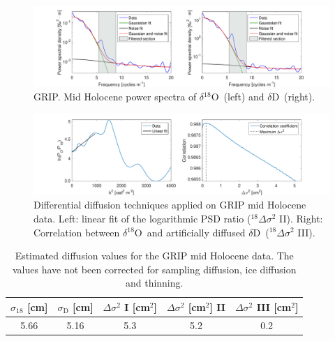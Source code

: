 \documentclass[11pt, draftcls, onecolumn]{IEEEtran} %
\numberwithin{equation}{section}
\numberwithin{table}{section}
\numberwithin{figure}{section}
\newcommand{\delOx}{$\delta{}^{18}\mathrm{O}$}
\newcommand{\delD}{$\delta\mathrm{D}$}
\begin{document}
\begin{appendices}
\begin{figure}[H]
	\vspace*{2mm}
	\begin{center}
		\includegraphics[width=1\textwidth]{Figure_21}
		\caption{GRIP. Mid Holocene power spectra of \delOx~(left) and \delD~(right).}  \label{fig:GRIP_mid_fig_1}
	\end{center}
\end{figure}

\begin{figure}[H]
	\vspace*{2mm}
	\begin{center}
		\includegraphics[width=1\textwidth]{Figure_22}
		\caption{Differential diffusion techniques applied on GRIP mid Holocene data. 
			Left: linear fit of the logarithmic PSD ratio ($^{18}\Delta\sigma^2$ II). Right: 
			Correlation between \delOx~and artificially diffused \delD~($^{18}\Delta\sigma^2$ III).}  \label{fig:GRIP_mid_fig_2}
	\end{center}
\end{figure}

\begin{table}[H]
	\center
	\caption{Estimated diffusion values for the GRIP mid Holocene data.
		The values have not been corrected for sampling diffusion, ice diffusion and thinning.}
	\label{GRIP_mid_holo}
	\begin{tabular}{c c c c c} 
		\toprule
		$\sigma_{18}$ [cm] & $\sigma_\mathrm{D}$ [cm] & $\Delta\sigma^2$ I [cm$^2$] & $\Delta\sigma^2$ [cm$^2$] II & $\Delta\sigma^2$ III [cm$^2$] \\
		\midrule
		5.66 &   5.16 &     5.3 &     5.2 &     0.2 \\
		\bottomrule		
	\end{tabular}
\end{table}


\end{appendices}
\end{document}

